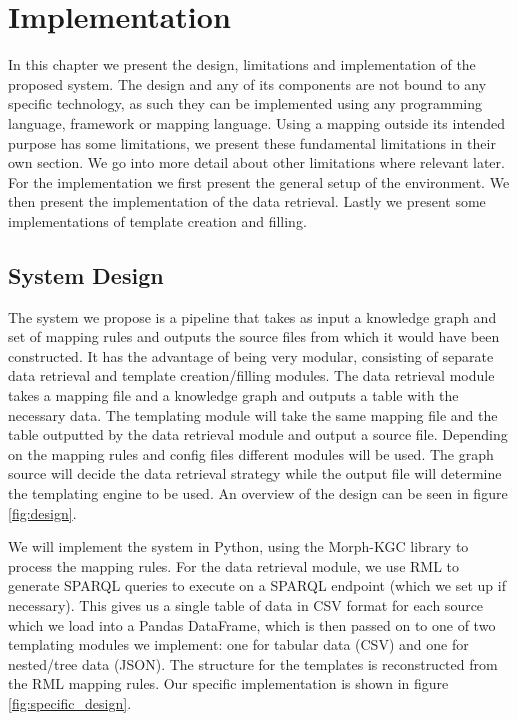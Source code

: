\chapter{Implementation}
\label{chapter:implementation}
In this chapter we present the design, limitations and implementation of the proposed system. The design and any of its components are not bound to any specific technology, as such they can be implemented using any programming language, framework or mapping language. Using a mapping outside its intended purpose has some limitations, we present these fundamental limitations in their own section. We go into more detail about other limitations where relevant later. For the implementation we first present the general setup of the environment. We then present the implementation of the data retrieval. Lastly we present some implementations of template creation and filling.

\section{System Design}
The system we propose is a pipeline that takes as input a knowledge graph and set of mapping rules and outputs the source files from which it would have been constructed. It has the advantage of being very modular, consisting of separate data retrieval and template creation/filling modules. The data retrieval module takes a mapping file and a knowledge graph and outputs a table with the necessary data. The templating module will take the same mapping file and the table outputted by the data retrieval module and output a source file. Depending on the mapping rules and config files different modules will be used. The graph source will decide the data retrieval strategy while the output file will determine the templating engine to be used. An overview of the design can be seen in figure \ref{fig:design}.

We will implement the system in Python, using the Morph-KGC library to process the mapping rules. For the data retrieval module, we use RML to generate SPARQL queries to execute on a SPARQL endpoint (which we set up if necessary). This gives us a single table of data in CSV format for each source which we load into a Pandas DataFrame, which is then passed on to one of two templating modules we implement: one for tabular data (CSV) and one for nested/tree data (JSON). The structure for the templates is reconstructed from the RML mapping rules. Our specific implementation is shown in figure \ref{fig:specific_design}.

